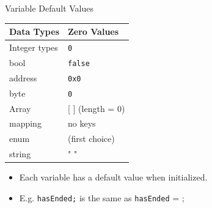 \documentclass[handout]{beamer}
\begin{document}
\begin{frame}{Variable Default Values}

	\begin{table}
		\begin{tabular}{m{4cm} m{4cm}}
		\rowcolor{highlight}
			\hline
			Data Types & Zero Values\\
			\hline 
			\rowcolor{brightanthracite}
			Integer types & \texttt{0} \\
			bool &  \texttt{false} \\
			\rowcolor{brightanthracite}
			address & \texttt{0x0} \\
			byte & \texttt{0} \\
			\rowcolor{brightanthracite}
			Array & [ ] (length = 0) \\
			mapping & no keys \\
			\rowcolor{brightanthracite}
			enum & (first choice) \\
			string & " " \\
			\hline
		\end{tabular}
	\end{table}	

\begin{itemize}
		\item Each variable has a default value when initialized.
		\item E.g.  \texttt{hasEnded;} is the same as  \texttt{hasEnded} = ;
	\end{itemize}	
	
\end{frame}

\end{document}
